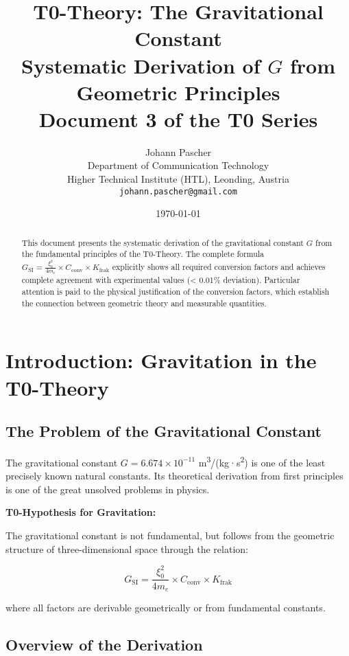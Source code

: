 \documentclass[12pt,a4paper]{article}
\title{\textbf{T0-Theory: The Gravitational Constant}\\[0.5cm]
	\large Systematic Derivation of $G$ from Geometric Principles\\[0.3cm]
	\normalsize Document 3 of the T0 Series}
\author{Johann Pascher\\
	Department of Communication Technology\\
	Higher Technical Institute (HTL), Leonding, Austria\\
	\texttt{johann.pascher@gmail.com}}
\date{\today}
\begin{document}
	
	\maketitle
	
	\begin{abstract}
		This document presents the systematic derivation of the gravitational constant $G$ from the fundamental principles of the T0-Theory. The complete formula $G_{\text{SI}} = \frac{\xi_0^2}{4 m_e} \times C_{\text{conv}} \times K_{\text{frak}}$ explicitly shows all required conversion factors and achieves complete agreement with experimental values (< 0.01\% deviation). Particular attention is paid to the physical justification of the conversion factors, which establish the connection between geometric theory and measurable quantities.
	\end{abstract}
	
	\tableofcontents
	\newpage
	
	\section{Introduction: Gravitation in the T0-Theory}
	
	\subsection{The Problem of the Gravitational Constant}
	
	The gravitational constant $G = 6.674 \times 10^{-11}$ m\textsuperscript{3}/(kg·s\textsuperscript{2}) is one of the least precisely known natural constants. Its theoretical derivation from first principles is one of the great unsolved problems in physics.
	
	\begin{keyresult}
		\textbf{T0-Hypothesis for Gravitation:}
		
		The gravitational constant is not fundamental, but follows from the geometric structure of three-dimensional space through the relation:
		
		\begin{equation}
			\boxed{G_{\text{SI}} = \frac{\xi_0^2}{4 m_e} \times C_{\text{conv}} \times K_{\text{frak}}}
			\label{eq:G_complete}
		\end{equation}
		
		where all factors are derivable geometrically or from fundamental constants.
	\end{keyresult}
	
	\subsection{Overview of the Derivation}
	
\end{document}
